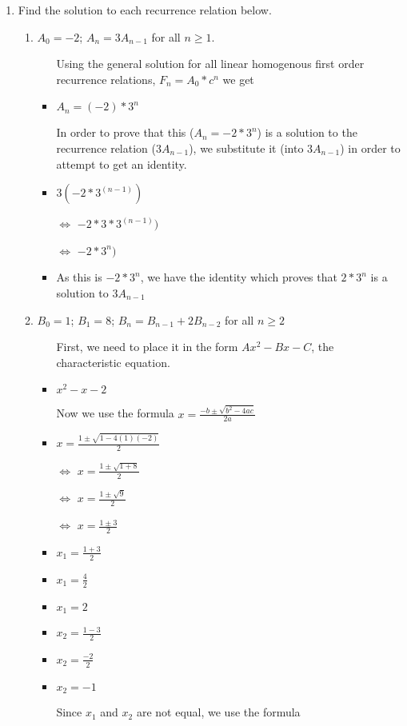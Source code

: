 \documentclass{article}
\begin{document}
\begin{enumerate}
\item Find the solution to each recurrence relation below.
  \begin{enumerate}
  \item $A_{0}=-2$; $A_{n}=3A_{n-1}$ for all $n\geq1$.
    \begin{itemize}
    \item [] Using the general solution for all linear homogenous first order recurrence relations, $F_{n}=A_{0}*c^{n}$ we get
    \item $A_{n}=(-2)*3^{n}$
    \item [] In order to prove that this ($A_{n}=-2*3^{n}$) is a solution to the recurrence relation ($3A_{n-1}$), we substitute it (into $3A_{n-1}$) in order to attempt to get an identity.
    \item $3(-2*3^{(n-1)})$
    \item [$\Leftrightarrow$]$-2*3*3^{(n-1)})$
    \item [$\Leftrightarrow$]$-2*3^{n})$
    \item As this is $-2*3^{n}$, we have the identity which proves that $2*3^{n}$ is a solution to $3A_{n-1}$
    \end{itemize}
  \item $B_{0}=1$; $B_{1}=8$; $B_{n}=B_{n-1}+2B_{n-2}$ for all $n\geq2$
    \begin{itemize}
    \item [] First, we need to place it in the form $Ax^{2}-Bx-C$, the characteristic equation.
    \item $x^{2}-x-2$
    \item [] Now we use the formula {\Large $x=\frac{-b \pm \sqrt{b^{2}-4ac}}{2a}$}
    \item {\Large $x=\frac{1 \pm \sqrt{1-4(1)(-2)}}{2}$}
    \item [$\Leftrightarrow$]{\Large $x=\frac{1 \pm \sqrt{1+8}}{2}$}
    \item [$\Leftrightarrow$]{\Large $x=\frac{1 \pm \sqrt{9}}{2}$}
    \item [$\Leftrightarrow$]{\Large $x=\frac{1 \pm 3}{2}$}
    \item {\Large $x_{1}=\frac{1+3}{2}$}
    \item {\Large $x_{1}=\frac{4}{2}$}
    \item {\Large $x_{1}=2$}
    \item {\Large $x_{2}=\frac{1-3}{2}$}
    \item {\Large $x_{2}=\frac{-2}{2}$}
    \item {\Large $x_{2}=-1$}
    \item [] Since $x_{1}$ and $x_{2}$ are not equal, we use the formula \\

\end{itemize}
\end{enumerate}
\end{enumerate}
\end{document}
